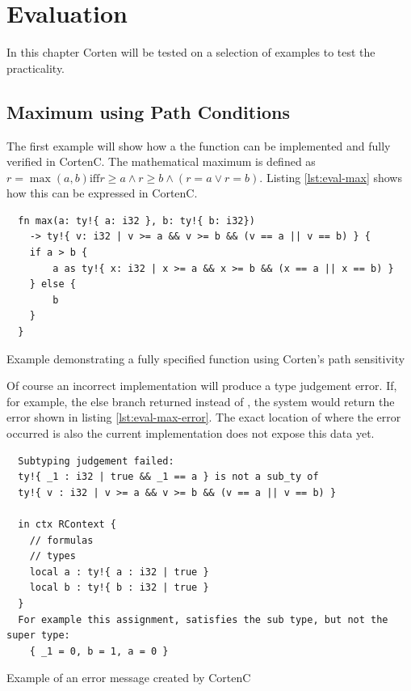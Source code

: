 \documentclass[twoside, english]{sdqthesis}
\theoremstyle{definition}
\begin{document}

\chapter{Evaluation} \label{ch:evaluation}

In this chapter Corten will be tested on a selection of examples to test the practicality.

\section{Maximum using Path Conditions}

The first example will show how a the  function can be implemented and fully verified in CortenC. The mathematical maximum is defined as $r = \max(a, b) \text{iff} r \geq a \wedge r \geq b \wedge (r = a \vee r = b)$. Listing \ref{lst:eval-max} shows how this can be expressed in CortenC.


\begin{listing}[ht]
  \begin{verbatim}
  fn max(a: ty!{ a: i32 }, b: ty!{ b: i32}) 
    -> ty!{ v: i32 | v >= a && v >= b && (v == a || v == b) } {
    if a > b {
        a as ty!{ x: i32 | x >= a && x >= b && (x == a || x == b) }
    } else {
        b
    }
  }
  \end{verbatim}
  \caption{Example demonstrating a fully specified  function using Corten's path sensitivity}
  \label{lst:eval-max}
\end{listing}

Of course an incorrect implementation will produce a type judgement error. If, for example, the else branch returned  instead of , the system would return the error shown in listing \ref{lst:eval-max-error}. The exact location of where the error occurred is also the current implementation does not expose this data yet.

\begin{listing}[ht]
  \begin{verbatim}
  Subtyping judgement failed: 
  ty!{ _1 : i32 | true && _1 == a } is not a sub_ty of 
  ty!{ v : i32 | v >= a && v >= b && (v == a || v == b) } 

  in ctx RContext {
    // formulas
    // types
    local a : ty!{ a : i32 | true }
    local b : ty!{ b : i32 | true }
  }
  For example this assignment, satisfies the sub type, but not the super type:
    { _1 = 0, b = 1, a = 0 }
  \end{verbatim}
  \caption{Example of an error message created by CortenC}
  \label{lst:eval-max-error}
\end{listing}
\end{document}
